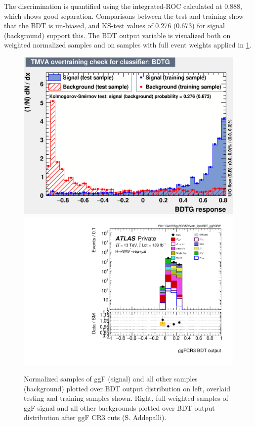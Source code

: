The discrimination is quantified using the integrated-ROC calculated at 0.888, which shows good separation. Comparisons between the test and training show that the BDT is un-biased, and KS-test values of 0.276 (0.673) for signal (background) support this. The BDT output variable is visualized both on weighted normalized samples and on samples with full event weights applied in \ref{fig:ggFCR3BDTresult}.

\begin{figure}[!htbp]
\centering
  \includegraphics[width=.4\linewidth]{Pictures/ggFCR3/overtrain_BDTG.eps}
  \includegraphics[width=.45\linewidth]{Pictures/run2-emme-CutVBFggFCR3ZttVeto_2jet-BDT_ggFCR3-log.pdf}
\caption{Normalized samples of ggF (signal) and all other samples (background) plotted over BDT output distribution on left, overlaid testing and training samples shown. Right, full weighted samples of ggF signal and all other backgrounds plotted over BDT output distribution after ggF CR3 cuts (S. Addepalli).}
\label{fig:ggFCR3BDTresult}
\end{figure}

